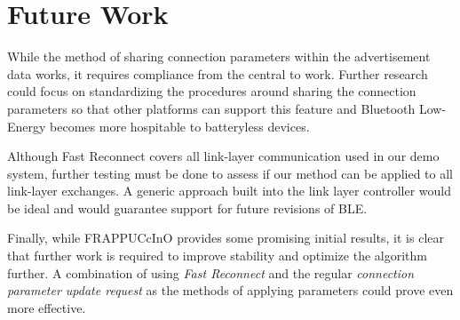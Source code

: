 \chapter{Future Work}
\label{chp:futurework}

While the method of sharing connection parameters within the advertisement data works, it requires compliance from the central to work. Further research could focus on standardizing the procedures around sharing the connection parameters so that other platforms can support this feature and Bluetooth Low-Energy becomes more hospitable to batteryless devices.

Although Fast Reconnect covers all link-layer communication used in our demo system, further testing must be done to assess if our method can be applied to all link-layer exchanges. A generic approach built into the link layer controller would be ideal and would guarantee support for future revisions of BLE.

Finally, while FRAPPUCcInO provides some promising initial results, it is clear that further work is required to improve stability and optimize the algorithm further. A combination of using \textit{Fast Reconnect} and the regular \textit{connection parameter update request} as the methods of applying parameters could prove even more effective.